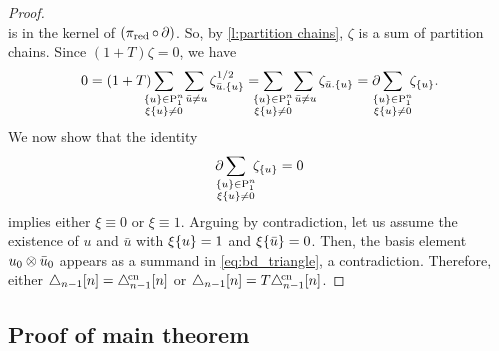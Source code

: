 \begin{proof}
\[	\]
	is in the kernel of $(\operatorname{\pi_{\text{red}}} \circ \operatorname{\partial})$.
	So, by \cref{l:partition chains}, $\zeta$ is a sum of partition chains.
	Since $(1+T) \zeta = 0$, we have
	\[
	0 = (1+T)\sum_{\mathclap{\substack{\set{u} \in \P_1^n \\ \xi \set{u} \neq 0}}} \
	\sum_{\ \bar{u} \neq u} \zeta^{1/2}_{\bar{u}.\set{u}} =
	\sum_{\mathclap{\substack{\set{u} \in \P_1^n \\ \xi \set{u} \neq 0}}} \
	\sum_{\ \bar{u} \neq u} \zeta_{\bar{u}.\set{u}} =
	\bd \sum_{\mathclap{\substack{\set{u} \in \P_1^n \\ \xi \set{u} \neq 0}}} \ \zeta_{\set{u}}.
	\]
	We now show that the identity
	\begin{equation}\label{eq:bd_triangle}
		\bd\sum_{\mathclap{\substack{\set{u} \in \P_1^n \\ \xi \set{u} \neq 0}}} \ \zeta_{\set{u}} = 0
	\end{equation}
	implies either $\xi \equiv 0$ or $\xi \equiv 1$.
	Arguing by contradiction, let us assume the existence of $u$ and $\bar{u}$ with $\xi\{u\} = 1$
	and $\xi\{\bar u\} = 0$.
	Then, the basis element $u_0 \otimes \bar u_0$ appears as a summand in \cref{eq:bd_triangle}, a contradiction.
	Therefore, either $\triangle_{n-1}[n] = \triangle^{\!\mathrm{cn}}_{n-1}[n]$ or $\triangle_{n-1}[n] = T\triangle^{\!\mathrm{cn}}_{n-1}[n]$.
\end{proof}

\subsection{Proof of main theorem}\label{ss:proof}

